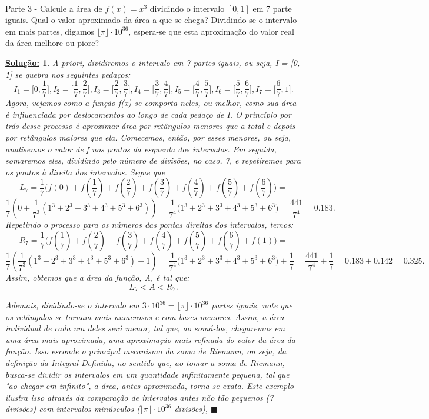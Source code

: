 \documentclass{article}
\newtheorem*{sol*}{\underline{Solu\c c\~ao:}}
\renewcommand\qedsymbol{$\blacksquare$}
\begin{document}
\paragraph{} Parte 3 - Calcule a \'area de $f(x) = x^3$ dividindo o intervalo $[0, 1]$ em 7 parte iguais. Qual o valor aproximado da \'area a que se chega? Dividindo-se o intervalo em mais partes, digamos $\lfloor{\pi}\rfloor\cdot{10^{36}}$, espera-se que esta aproxima\c c\~ao do valor real da \'area melhore ou piore?
\begin{sol*}
	A priori, dividiremos o intervalo em 7 partes iguais, ou seja, I = [0, 1] se quebra nos seguintes peda\c cos:
	$$
		I_1 = \biggl[0, \frac{1}{7}\biggr],     I_2 = \biggl[\frac{1}{7}, \frac{2}{7}\biggr],       I_3 = \biggl[\frac{2}{7}, \frac{3}{7}\biggr],    I_4 = \biggl[\frac{3}{7}, \frac{4}{7}\biggr],    I_5 = \biggl[\frac{4}{7}, \frac{5}{7}\biggr], I_6 = \biggl[\frac{5}{7}, \frac{6}{7}\biggr], I_7 = \biggl[\frac{6}{7}, 1\biggr].
	$$
	Agora, vejamos como a fun\c c\~ao f(x) se comporta neles, ou melhor, como sua \'area \'e influenciada por deslocamentos ao longo de cada peda\c co de I. O princ\'ipio por tr\'as desse processo \'e aproximar \'area por ret\^angulos menores que a total e depois por ret\^angulos maiores que ela. Comecemos, ent\~ao, por esses menores, ou seja, analisemos o valor de f nos pontos da esquerda dos intervalos. Em seguida, somaremos eles, dividindo pelo n\'umero de divis\~oes, no caso, 7, e repetiremos para os pontos \`a direita dos intervalos. Segue que
	$$
		L_7 = \frac{1}{7}\biggl(f(0) + f(\frac{1}{7}) + f(\frac{2}{7}) + f(\frac{3}{7}) + f(\frac{4}{7}) + f(\frac{5}{7}) + f(\frac{6}{7})\biggr) =
	$$
	$$
		\frac{1}{7}(0 + \frac{1}{7^3}(1^3 + 2^3 + 3^3 + 4^3 + 5^3 + 6^3)) = \frac{1}{7^4}\biggl(1^3 + 2^3 + 3^3 + 4^3 + 5^3 + 6^3\biggr) = \frac{441}{7^4}
		= 0.183.$$
	Repetindo o processo para os n\'umeros das pontas direitas dos intervalos, temos:
	$$
		R_7 = \frac{1}{7}\biggl(f(\frac{1}{7}) + f(\frac{2}{7}) + f(\frac{3}{7}) + f(\frac{4}{7}) + f(\frac{5}{7}) + f(\frac{6}{7}) + f(1)\biggr) =
	$$
	$$
		\frac{1}{7}(\frac{1}{7^3}(1^3 + 2^3 + 3^3 + 4^3 + 5^3 + 6^3) + 1) = \frac{1}{7^4}\biggl(1^3 + 2^3 + 3^3 + 4^3 + 5^3 + 6^3\biggr) + \frac{1}{7} = \frac{441}{7^4} + \frac{1}{7}= 0.183 + 0.142 = 0.325.
	$$
	Assim, obtemos que a \'area da fun\c c\~ao, A, \'e tal que:
	$$
		L_7 < A < R_7.
	$$
	\par{}Ademais, dividindo-se o intervalo em $3\cdot{10^{36}} = \lfloor{\pi}\rfloor\cdot{10^{36}}$ partes iguais, note que os ret\^angulos se tornam mais numerosos e com bases menores. Assim, a \'area individual de cada um deles ser\'a menor, tal que, ao som\'a-los, chegaremos em uma \'area mais aproximada, uma aproxima\c c\~ao mais refinada do valor da \'area da fun\c c\~ao. Isso esconde o principal mecanismo da soma de Riemann, ou seja, da defini\c c\~ao da Integral Definida, no sentido que, ao tomar a soma de Riemann, busca-se dividir os intervalos em um quantidade infinitamente pequena, tal que "ao chegar em infinito", a \'area, antes aproximada, torna-se exata. Este exemplo ilustra isso atrav\'es da compara\c c\~ao de intervalos antes n\~ao t\~ao pequenos (7 divis\~oes) com intervalos min\'usculos ($\lfloor{\pi}\rfloor\cdot{10}^{36}$ divis\~oes),
	\qedsymbol
\end{sol*}
\end{document}

